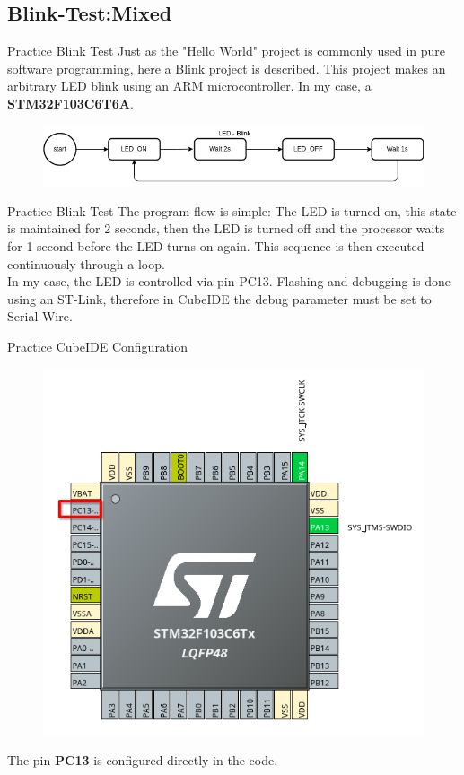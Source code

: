 \documentclass{beamer}
\begin{document}
\subsection{Blink-Test:Mixed}
\begin{frame}{Practice}
	{Blink Test}
	Just as the "Hello World" project is commonly used in pure software programming, here a Blink project is described. This project makes an arbitrary LED blink using an ARM microcontroller. In my case, a \textbf{STM32F103C6T6A}.
	\begin{figure}
		\centering
		\includegraphics[width=\linewidth]{LED_Blink_Flow.png}
	\end{figure}
\end{frame}
\begin{frame}{Practice}
	{Blink Test}
	The program flow is simple: The LED is turned on, this state is maintained for 2 seconds, then the LED is turned off and the processor waits for 1 second before the LED turns on again. This sequence is then executed continuously through a loop.\\ 
	\vspace{0.2cm}
	In my case, the LED is controlled via pin PC13. Flashing and debugging is done using an ST-Link, therefore in CubeIDE the debug parameter must be set to Serial Wire.
\end{frame}
\begin{frame}{Practice}
	{CubeIDE Configuration}
	\begin{figure}
		\includegraphics[width=.6\linewidth]{Blink_001.png}
	\end{figure}
	The pin \textbf{PC13} is configured directly in the code.
\end{frame}
\end{document}
